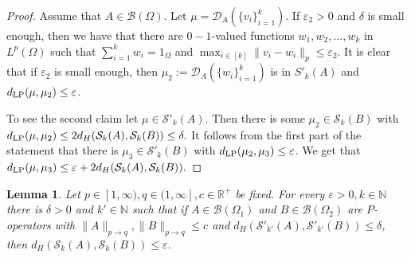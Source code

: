 \documentclass[a4wider]{amsart}
\newtheorem{lemma}[theorem]{Lemma}
\theoremstyle{definitionbreak}\newtheorem{D}[theorem]{Definition}
\theoremstyle{definitionbreak}\newtheorem*{D*}{Definition}
\begin{document}
\begin{proof} Assume that $A\in\mathcal{B}(\Omega)$. Let $\mu=\mathcal{D}_A(\{v_i\}_{i=1}^k)$. If $\varepsilon_2>0$ and $\delta$ is small enough, then we have that there are $0-1$-valued functions  $w_1,w_2,\dots,w_k$ in $L^p(\Omega)$ such that $\sum_{i=1}^k w_i=1_{\Omega}$ and $\max_{i\in [k]}\|v_i-w_i\|_p\leq\varepsilon_2$. It is clear that if $\varepsilon_2$ is small enough, then $\mu_2:=\mathcal{D}_A(\{w_i\}_{i=1}^k)$ is in $S'_k(A)$ and $d_{\rm LP}(\mu,\mu_2)\leq\varepsilon$. 

To see the second claim let $\mu\in \mathcal{S}'_k(A)$. Then there is some $\mu_2\in\mathcal{S}_k(B)$ with $d_{\rm LP}(\mu,\mu_2)\leq 2d_H(\mathcal{S}_k(A),\mathcal{S}_k(B))\leq\delta.$ It follows from the first part of the statement that there is $\mu_3\in\mathcal{S}'_k(B)$ with $d_{\rm LP}(\mu_2,\mu_3)\leq\varepsilon$. We get that $d_{\rm LP}(\mu,\mu_3)\leq \varepsilon+2d_H(\mathcal{S}_k(A),\mathcal{S}_k(B)).$
\end{proof}

\begin{lemma}  Let $p\in [1,\infty),q\in (1,\infty], c\in\mathbb{R}^+$ be fixed.  For every $\varepsilon>0,k\in\mathbb{N}$ there is $\delta>0$ and $k'\in\mathbb{N}$ such that if $A\in\mathcal{B}(\Omega_1)$ and $B\in\mathcal{B}(\Omega_2)$ are $P$-operators with $\|A\|_{p\to q},\|B\|_{p\to q}\leq c$ and $d_H(\mathcal{S}'_{k'}(A),\mathcal{S}'_{k'}(B))\leq\delta$, then $d_H(\mathcal{S}_k(A),\mathcal{S}_k(B))\leq\varepsilon$.
\end{lemma}
\end{document}
